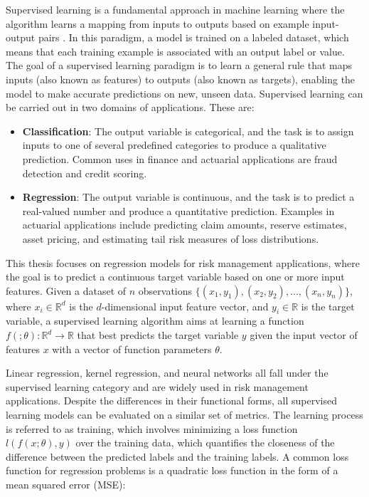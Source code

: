 Supervised learning is a fundamental approach in machine learning where the algorithm learns a mapping from inputs to outputs based on example input-output pairs \cite{galton1886regression}. 
In this paradigm, a model is trained on a labeled dataset, which means that each training example is associated with an output label or value. 
The goal of a supervised learning paradigm is to learn a general rule that maps inputs (also known as features) to outputs (also known as targets), enabling the model to make accurate predictions on new, unseen data.
Supervised learning can be carried out in two domains of applications.
These are:

\begin{itemize} 
    \item \textbf{Classification}: The output variable is categorical, and the task is to assign inputs to one of several predefined categories to produce a qualitative prediction. 
    Common uses in finance and actuarial applications are fraud detection and credit scoring.
    \item \textbf{Regression}: The output variable is continuous, and the task is to predict a real-valued number and produce a quantitative prediction. 
    Examples in actuarial applications include predicting claim amounts, reserve estimates, asset pricing, and estimating tail risk measures of loss distributions.
\end{itemize}

This thesis focuses on regression models for risk management applications, where the goal is to predict a continuous target variable based on one or more input features.
Given a dataset of $n$ observations $\{(x_1, y_1), (x_2, y_2), \ldots, (x_n, y_n)\}$, where $x_i \in \mathbb{R}^d$ is the $d$-dimensional input feature vector, and $y_i \in \mathbb{R}$ is the target variable, a supervised learning algorithm aims at learning a function $f(;\theta): \mathbb{R}^d \rightarrow \mathbb{R}$ that best predicts the target variable $y$ given the input vector of features $x$ with a vector of function parameters $\theta$.

Linear regression, kernel regression, and neural networks all fall under the supervised learning category and are widely used in risk management applications.
Despite the differences in their functional forms, all supervised learning models can be evaluated on a similar set of metrics.
The learning process is referred to as training, which involves minimizing a loss function $l(f(x; \theta),y)$ over the training data, which quantifies the closeness of the difference between the predicted labels and the training labels.
A common loss function for regression problems is a quadratic loss function in the form of a mean squared error (MSE):

